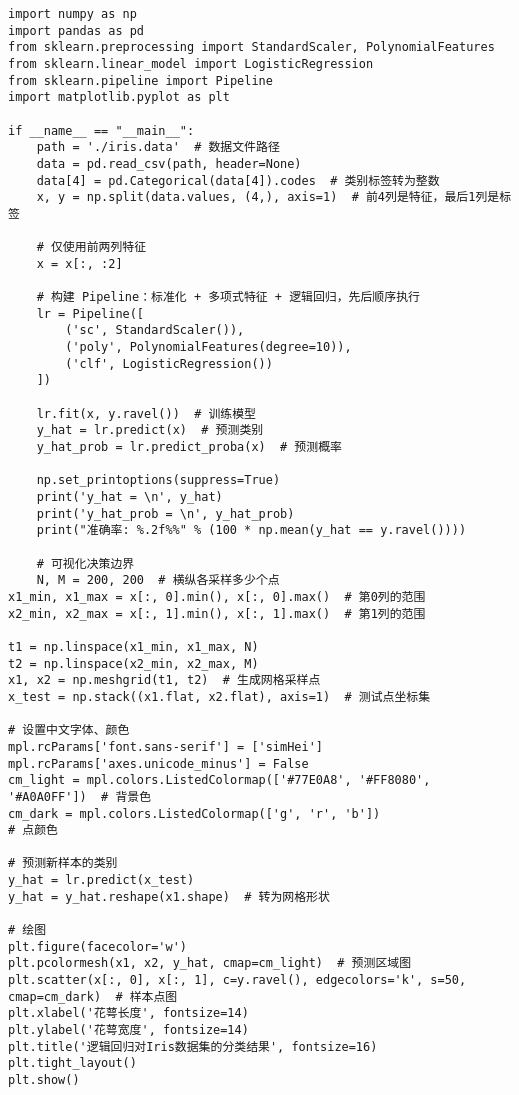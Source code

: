 \documentclass{article}
\begin{document}
\begin{lstlisting}
import numpy as np
import pandas as pd
from sklearn.preprocessing import StandardScaler, PolynomialFeatures
from sklearn.linear_model import LogisticRegression
from sklearn.pipeline import Pipeline
import matplotlib.pyplot as plt

if __name__ == "__main__":
    path = './iris.data'  # 数据文件路径
    data = pd.read_csv(path, header=None)
    data[4] = pd.Categorical(data[4]).codes  # 类别标签转为整数
    x, y = np.split(data.values, (4,), axis=1)  # 前4列是特征，最后1列是标签

    # 仅使用前两列特征
    x = x[:, :2]

    # 构建 Pipeline：标准化 + 多项式特征 + 逻辑回归，先后顺序执行
    lr = Pipeline([
        ('sc', StandardScaler()),
        ('poly', PolynomialFeatures(degree=10)),
        ('clf', LogisticRegression())
    ])

    lr.fit(x, y.ravel())  # 训练模型
    y_hat = lr.predict(x)  # 预测类别
    y_hat_prob = lr.predict_proba(x)  # 预测概率

    np.set_printoptions(suppress=True)
    print('y_hat = \n', y_hat)
    print('y_hat_prob = \n', y_hat_prob)
    print("准确率: %.2f%%" % (100 * np.mean(y_hat == y.ravel())))

    # 可视化决策边界
    N, M = 200, 200  # 横纵各采样多少个点
x1_min, x1_max = x[:, 0].min(), x[:, 0].max()  # 第0列的范围
x2_min, x2_max = x[:, 1].min(), x[:, 1].max()  # 第1列的范围

t1 = np.linspace(x1_min, x1_max, N)
t2 = np.linspace(x2_min, x2_max, M)
x1, x2 = np.meshgrid(t1, t2)  # 生成网格采样点
x_test = np.stack((x1.flat, x2.flat), axis=1)  # 测试点坐标集

# 设置中文字体、颜色
mpl.rcParams['font.sans-serif'] = ['simHei']
mpl.rcParams['axes.unicode_minus'] = False
cm_light = mpl.colors.ListedColormap(['#77E0A8', '#FF8080', '#A0A0FF'])  # 背景色
cm_dark = mpl.colors.ListedColormap(['g', 'r', 'b'])                     # 点颜色

# 预测新样本的类别
y_hat = lr.predict(x_test)
y_hat = y_hat.reshape(x1.shape)  # 转为网格形状

# 绘图
plt.figure(facecolor='w')
plt.pcolormesh(x1, x2, y_hat, cmap=cm_light)  # 预测区域图
plt.scatter(x[:, 0], x[:, 1], c=y.ravel(), edgecolors='k', s=50, cmap=cm_dark)  # 样本点图
plt.xlabel('花萼长度', fontsize=14)
plt.ylabel('花萼宽度', fontsize=14)
plt.title('逻辑回归对Iris数据集的分类结果', fontsize=16)
plt.tight_layout()
plt.show()
\end{lstlisting}
\end{document}

